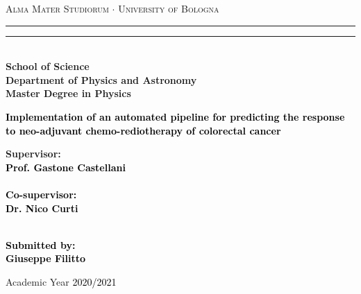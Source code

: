 \documentclass[12pt,a4paper]{report}
\begin{document}
\setlength{\headheight}{15pt}



\begin{titlepage}
%
%
%
%
\begin{center}
{{\Large{\textsc{Alma Mater Studiorum $\cdot$ University of  Bologna}}}} 
\rule[0.1cm]{15.8cm}{0.1mm}
\rule[0.5cm]{15.8cm}{0.6mm}
\\\vspace{3mm}
{\small{\bf School of Science \\
Department of Physics and Astronomy\\
Master Degree in Physics}}
\end{center}

\vspace{23mm}

\begin{center}\textcolor{black}{
%
%
{\Large{\bf Implementation of an automated pipeline for predicting the response to neo-adjuvant chemo-rediotherapy of colorectal cancer}}
}\end{center}

\vspace{50mm} \par \noindent

\begin{minipage}[t]{0.47\textwidth}
%
%
{\large{\bf Supervisor: \vspace{2mm}\\\textcolor{black}{
Prof. Gastone Castellani}\\\\
%
%
%
\textcolor{black}{
\bf Co-supervisor: \vspace{2mm}\\Dr. Nico Curti\\\\}}}
\end{minipage}
%
\hfill
%
\begin{minipage}[t]{0.47\textwidth}\raggedleft \textcolor{black}{
{\large{\bf Submitted by:
\vspace{2mm}\\
%
%
\textcolor{black}{
Giuseppe Filitto}}}
}
\end{minipage}

\vspace{32mm}

\begin{center}
%
%
Academic Year \textcolor{black}{ 2020/2021}
\end{center}

\end{titlepage}
\end{document}
